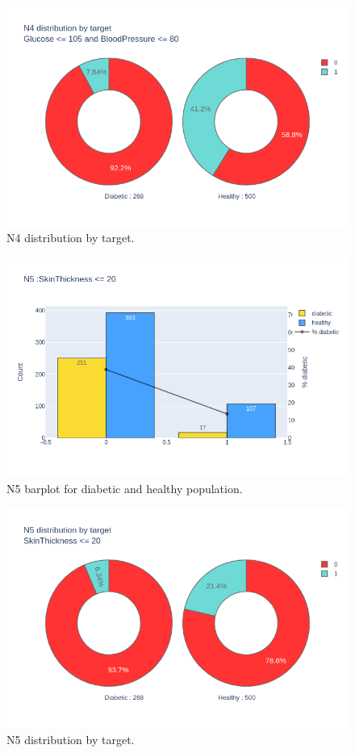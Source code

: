 \documentclass[12pt]{article}
\begin{document}
\begin{figure}[ht]
\centering
\includegraphics[width=1\textwidth]{newplot(22).png}
\caption{\label{fig:32} N4 distribution by target.}
\end{figure}

\begin{figure}[ht]
\centering
\includegraphics[width=1\textwidth]{newplot(23).png}
\caption{\label{fig:33} N5 barplot for diabetic and healthy population.}
\end{figure}

\begin{figure}[ht]
\centering
\includegraphics[width=1\textwidth]{newplot(24).png}
\caption{\label{fig:34} N5 distribution by target.}
\end{figure}
\end{document}
